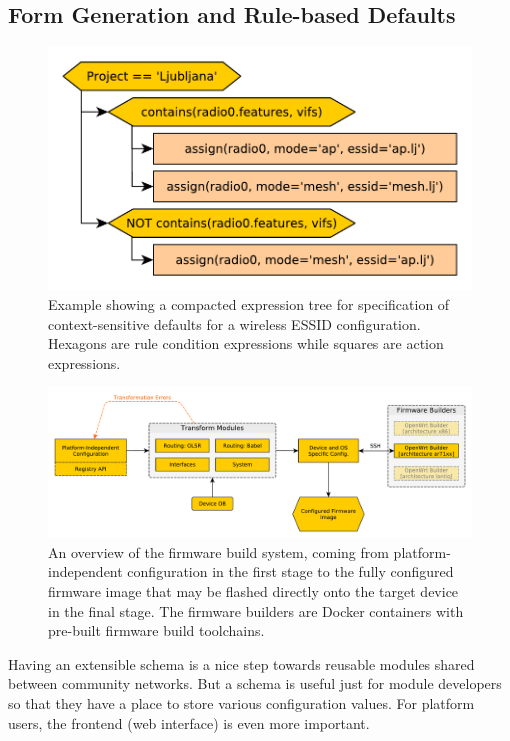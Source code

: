 \documentclass[5p,sort&compress]{elsarticle}
\begin{document}
\subsection{Form Generation and Rule-based Defaults}

\begin{figure}[t]
  \centering
  \includegraphics[scale=0.5]{figures/defaults-rules-tree.pdf}
  \caption{Example showing a compacted expression tree for specification of context-sensitive defaults for a wireless ESSID configuration. Hexagons are rule condition expressions while squares are action expressions.}
  \label{fig:defaults-rules-example}
\end{figure}

\begin{figure}
  \centering
  \includegraphics[scale=0.5]{figures/firmware-buildsystem.pdf}
  \caption{An overview of the firmware build system, coming from platform-independent configuration in the first stage to the fully configured firmware image that may be flashed directly onto the target device in the final stage.
The firmware builders are Docker containers with pre-built firmware build toolchains.}
  \label{fig:firmware-build-system}
\end{figure}

Having an extensible schema is a nice step towards reusable modules shared between community networks.
But a schema is useful just for module developers so that they have a place to store various configuration values.
For platform users, the frontend (web interface) is even more important.
\end{document}
